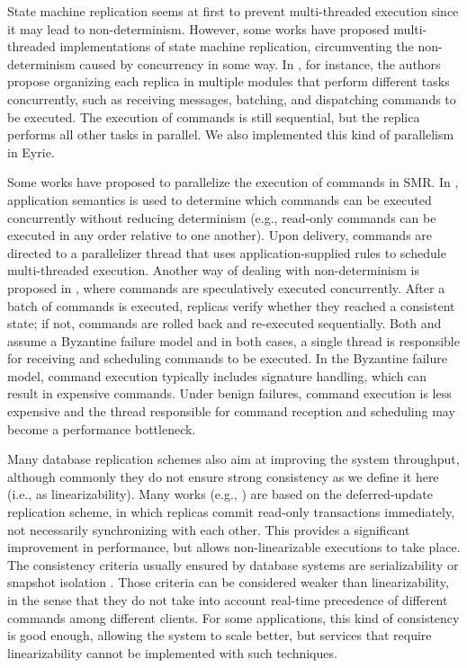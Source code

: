 \documentclass[11pt]{article}
\begin{document}
State machine replication seems at first to prevent multi-threaded execution since it may lead to non-determinism. 
However, some works have proposed multi-threaded implementations of state machine replication, circumventing the non-determinism caused by concurrency in some way. 
In \cite{santos2013htsmr}, for instance, the authors propose organizing each replica in multiple modules that perform different tasks concurrently, such as receiving messages, batching, and dispatching commands to be executed.
The execution of commands is still sequential, but the replica performs all other tasks in parallel. We also implemented this kind of parallelism in Eyrie.

Some works have proposed to parallelize the execution of commands in SMR. 
In \cite{kotla2004htbft}, application semantics is used to determine which commands can be executed concurrently without reducing determinism (e.g., read-only commands can be executed in any order relative to one another). 
Upon delivery, commands are directed to a parallelizer thread that uses application-supplied rules to schedule multi-threaded execution. 
Another way of dealing with non-determinism is proposed in \cite{kapritsos2012eve}, where commands are speculatively executed concurrently.
After a batch of commands is executed, replicas verify whether they reached a consistent state; if not, commands are rolled back and re-executed sequentially. 
Both \cite{kotla2004htbft} and \cite{kapritsos2012eve} assume a Byzantine failure model and in both cases, a single thread is responsible for receiving and scheduling commands to be executed. 
In the Byzantine failure model, command execution typically includes signature handling, which can result in expensive commands.
Under benign failures, command execution is less expensive and the thread responsible for command reception and scheduling may become a performance bottleneck.

Many database replication schemes also aim at improving the system throughput, although commonly they do not ensure strong consistency as we define it here (i.e., as linearizability). Many works (e.g., \cite{chundi96dur, kobus2013hybrid, sciascia2012sdur, SousaOMP01}) are based on the deferred-update replication scheme, in which replicas commit read-only transactions immediately, not necessarily synchronizing with each other. This provides a significant improvement in performance, but allows non-linearizable executions to take place. The consistency criteria usually ensured by database systems are serializability \cite{BHG87} or snapshot isolation \cite{LinKJPA09}. Those criteria can be considered weaker than linearizability, in the sense that they do not take into account real-time precedence of different commands among different clients. For some applications, this kind of consistency is good enough, allowing the system to scale better, but services that require linearizability cannot be implemented with such techniques.
\end{document}
